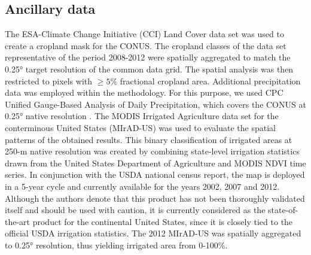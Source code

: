 \documentclass[hess, manuscript]{copernicus}
\begin{document}
\subsection{Ancillary data}
The ESA-Climate Change Initiative (CCI) Land Cover data set \citep{bontemps2013consistent} was used to create a cropland mask for the CONUS. The cropland classes of the data set representative of the period 2008-2012 were spatially aggregated to match the 0.25\si{\degree} target resolution of the common data grid. The spatial analysis was then restricted to pixels with $\geq 5\%$ fractional cropland area. Additional precipitation data was employed within the methodology. For this purpose, we used CPC Unified Gauge-Based Analysis of Daily Precipitation, which covers the CONUS at 0.25\si{\degree} native resolution \citep{Chen2008, Xie2010}. The MODIS Irrigated Agriculture data set for the conterminous United States (MIrAD-US) \citep{Pervez_2010} was used to evaluate the spatial patterns of the obtained results. This binary classification of irrigated areas at 250-m native resolution was created by combining state-level irrigation statistics drawn from the United States Department of Agriculture \citep{nass2012census} and MODIS NDVI time series. In conjunction with the USDA national census report, the map is deployed in a 5-year cycle and currently available for the years 2002, 2007 and 2012. Although the authors denote that this product has not been thoroughly validated itself and should be used with caution, it is currently considered as the state-of-the-art product for the continental United States, since it is closely tied to the official USDA irrigation statistics. The 2012 MIrAD-US was spatially aggregated to 0.25\si{\degree} resolution, thus yielding irrigated area from 0-100\%.

\newpage
\end{document}

